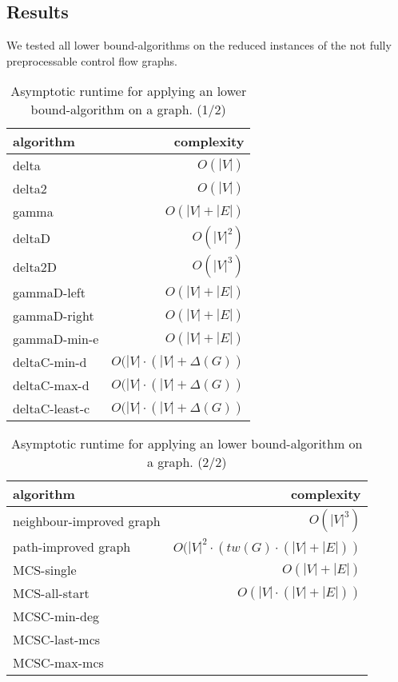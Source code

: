 \documentclass[a4wide]{article}
\begin{document}
\subsection{Results}

We tested all lower bound-algorithms on the reduced instances of the not fully preprocessable control flow graphs. \\

\begin{table}[h!]
\small
\centering
\begin{tabular}{|l|r|}
\hline 
algorithm & complexity \\
\hline  
\hline
delta  & $O(|V|)$ \\
delta2 & $O(|V|)$ \\
gamma  & $O(|V|+|E|)$ \\
\hline 
deltaD & $O(|V|^2)$ \\
delta2D & $O(|V|^3)$ \\
gammaD-left &  $O(|V|+|E|)$ \\
gammaD-right &  $O(|V|+|E|)$ \\
gammaD-min-e &  $O(|V|+|E|)$ \\
\hline 
deltaC-min-d &  $O(|V| \cdot(|V| + \Delta(G))$ \\
deltaC-max-d &  $O(|V| \cdot(|V| + \Delta(G))$ \\
deltaC-least-c &  $O(|V| \cdot(|V| + \Delta(G))$ \\
\hline 
\end{tabular}
\caption{Asymptotic runtime for applying an lower bound-algorithm on a graph. (1/2)}
\end{table}

\newpage

\begin{table}[h!]
\small
\centering
\begin{tabular}{|l|r|}
\hline 
algorithm & complexity \\
\hline  
\hline
neighbour-improved graph & $O(|V|^3)$ \\
path-improved graph & $O(|V|^2 \cdot (tw(G) \cdot (|V| + |E|))$ \\
\hline 
\hline 
MCS-single &  $O(|V|+|E|)$\\
MCS-all-start & $O(|V| \cdot(|V|+|E|))$\\
MCSC-min-deg &  \\
MCSC-last-mcs &  \\
MCSC-max-mcs &  \\
\hline 
\end{tabular}
\caption{Asymptotic runtime for applying an lower bound-algorithm on a graph. (2/2)}
\end{table}
\end{document}

